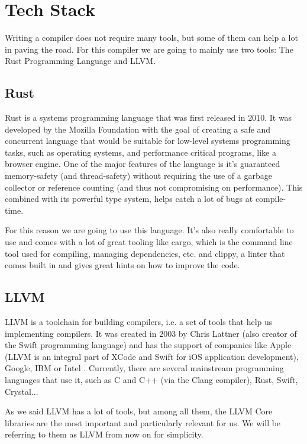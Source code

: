 ﻿\documentclass[10pt,a4paper,twocolumn,twoside]{article}
\begin{document}
\section{Tech Stack}

Writing a compiler does not require many tools, but some of them can help a lot
in paving the road. For this compiler we are going to mainly use two tools: 
The Rust Programming Language and LLVM.

\subsection{Rust}
Rust is a systems programming language that was first released in 2010. It was
developed by the Mozilla Foundation with the goal of creating a safe and
concurrent language that would be suitable for low-level systems programming
tasks, such as operating systems, and performance critical programs, like a
browser engine. One of the major features of the language is it's guaranteed
memory-safety (and thread-safety) without requiring the use of a garbage
collector or reference counting (and thus not compromising on performance).
This combined with its powerful type system, helps catch a lot of bugs at 
compile-time.

For this reason we are going to use this language. It's also really comfortable
to use and comes with a lot of great tooling like cargo, which is the command 
line tool used for compiling, managing dependencies, etc. and clippy, a linter
that comes built in and gives great hints on how to improve the code.

\subsection{LLVM}
LLVM is a toolchain for building compilers, i.e. a set of tools that help us
implementing compilers. It was created in 2003 by Chris Lattner (also creator of
the Swift programming language) and has the support of companies like Apple
(LLVM is an integral part of XCode and Swift for iOS application development),
Google, IBM or Intel \cite{sponsors}. Currently, there are several mainstream programming
languages that use it, such as C and C++ (via the Clang compiler), Rust, Swift,
Crystal...

As we said LLVM has a lot of tools, but among all them, the LLVM Core libraries
are the most important and particularly relevant for us. We will be referring to 
them as LLVM from now on for simplicity. 
\end{document}
